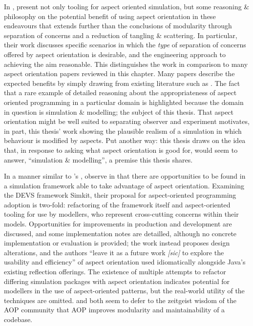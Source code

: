 In \cite{gulyas1999use}, \citeauthor{gulyas1999use} present not only tooling for
aspect oriented simulation, but some reasoning \& philosophy on the potential
benefit of using aspect orientation in these endeavours that extends further
than the conclusions of modularity through separation of concerns and a
reduction of tangling \& scattering. In particular, their work discusses
specific scenarios in which the \emph{type} of separation of concerns offered by
aspect orientation is desirable, and the engineering approach to achieving the
aim reasonable. This distinguishes the work in comparison to many aspect
orientation papers reviewed in this chapter. Many papers describe the expected
benefits by simply drawing from existing literature such as
\cite{kiczales1997aspect}. The fact that a rare example of detailed reasoning
about the appropriateness of aspect oriented programming in a particular domain
is highlighted because the domain in question is simulation \& modelling; the
subject of this thesis. That aspect orientation might be well suited to
separating observer and experiment motivates, in part, this thesis' work showing
the plausible realism of a simulation in which behaviour is modified by aspects.
Put another way: this thesis draws on the idea that, in response to
\citeauthor{steimann06paradoxical} asking what aspect orientation is good for,
\citeauthor{gulyas1999use} would seem to answer, ``simulation \& modelling'', a
premise this thesis shares.

In a manner similar to \citeauthor{chibani2019using}'s
\cite{chibani2019using,chibani2013toward},
\citeauthor{DEVSaspectorientation2008aksu} observe in
\cite{DEVSaspectorientation2008aksu} that there are opportunities to be found in
a simulation framework able to take advantage of aspect orientation. Examining
the DEVS framework Simkit, their proposal for aspect-oriented programming
adoption is two-fold: refactoring of the framework itself and aspect-oriented
tooling for use by modellers, who represent cross-cutting concerns within their
models. Opportunities for improvements in production and development are
discussed, and some implementation notes are detailled, although no concrete
implementation or evaluation is provided; the work instead proposes design
alterations, and the authors ``leave it as a future work \emph{[sic]} to explore
the usability and efficiency'' of aspect orientation used idiomatically
alongside Java's existing reflection offerings. The existence of multiple
attempts to refactor differing simulation packages with aspect orientation
indicates potential for modellers in the use of aspect-oriented patterns, but
the real-world utility of the techniques are omitted.
\citeauthor{chibani2019using} and \citeauthor{DEVSaspectorientation2008aksu}
both seem to defer to the zeitgeist wisdom of the AOP community that AOP
improves modularity and maintainability of a codebase.


